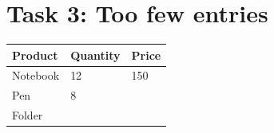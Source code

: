 \documentclass{article}
\begin{document}
\section*{Task 3: Too few entries}

\begin{tabular}{lll}
\hline
Product & Quantity & Price \\
\hline
Notebook & 12 & 150 \\
Pen & 8 \\
Folder \\
\hline
\end{tabular}
\end{document}
